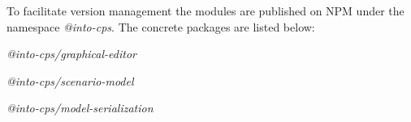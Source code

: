 To facilitate version management the modules are published on NPM under the namespace \emph{@into-cps}.
The concrete packages are listed below:
\begin{itemize}[\label={}]
\item \emph{@into-cps/graphical-editor}
\item \emph{@into-cps/scenario-model}
\item \emph{@into-cps/model-serialization}
\end{itemize}
